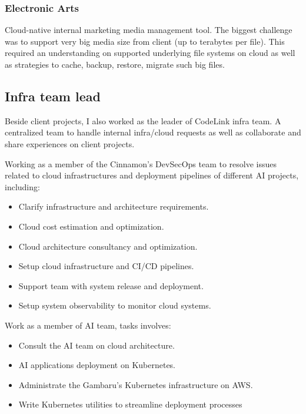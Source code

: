 \documentclass{resume}
\begin{document}
\subsubsection{{\textbf{Electronic Arts}}}
Cloud-native internal marketing media management tool. The biggest challenge was to support very big media size from client (up to terabytes per file). This required an understanding on supported underlying file systems on cloud as well as strategies to cache, backup, restore, migrate such big files.

\subsection{{\textbf{Infra team lead}}}

Beside client projects, I also worked as the leader of CodeLink infra team. A centralized team to handle internal infra/cloud requests as well as collaborate and share experiences on client projects.


Working as a member of the Cinnamon's DevSecOps team to resolve issues related to cloud infrastructures and deployment pipelines of different AI projects, including:
\begin{itemize}[parsep=0.5ex]
  \item Clarify infrastructure and architecture requirements.
  \item Cloud cost estimation and optimization.
  \item Cloud architecture consultancy and optimization.
  \item Setup cloud infrastructure and CI/CD pipelines.
  \item Support team with system release and deployment.
  \item Setup system observability to monitor cloud systems.
\end{itemize}


Work as a member of AI team, tasks involves:
\begin{itemize}[parsep=0.5ex]
  \item Consult the AI team on cloud architecture.
  \item AI applications deployment on Kubernetes.
  \item Administrate the Gambaru's Kubernetes infrastructure on AWS.
  \item Write Kubernetes utilities to streamline deployment processes
\end{itemize}
\end{document}
